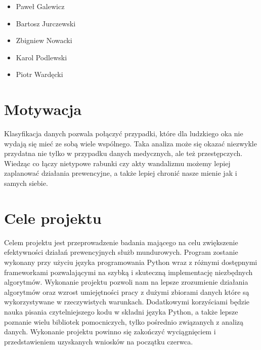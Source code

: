 \documentclass[a4paper,11pt]{article}
\begin{document}
\begin{itemize}[noitemsep,topsep=0pt,leftmargin=1.1cm]
    \item Paweł Galewicz        
    \item Bartosz Jurczewski    
    \item Zbigniew Nowacki      
    \item Karol Podlewski       
    \item Piotr Wardęcki        
\end{itemize}



\section{Motywacja} \label{sec:motywacja}

Klasyfikacja danych pozwala połączyć przypadki, które dla ludzkiego oka nie wydają się mieć ze sobą wiele wspólnego. Taka analiza może się okazać niezwykle przydatna nie tylko w przypadku danych medycznych, ale też przestępczych. Wiedząc co łączy nietypowe rabunki czy akty wandalizmu możemy lepiej zaplanować działania prewencyjne, a także lepiej chronić nasze mienie jak i samych siebie.



\section{Cele projektu}

Celem projektu jest przeprowadzenie badania mającego na celu zwiększenie efektywności działań prewencyjnych służb mundurowych. Program zostanie wykonany przy użyciu języka programowania Python wraz z różnymi dostępnymi frameworkami pozwalającymi na szybką i skuteczną implementację niezbędnych algorytmów. Wykonanie projektu pozwoli nam na lepsze zrozumienie działania algorytmów oraz wzrost umiejętności pracy z dużymi zbiorami danych które są wykorzystywane w rzeczywistych warunkach. Dodatkowymi korzyściami będzie nauka pisania czytelniejszego kodu w składni języka Python, a także lepsze poznanie wielu bibliotek pomocniczych, tylko pośrednio związanych z analizą danych. Wykonanie projektu powinno się zakończyć wyciągnięciem i przedstawieniem uzyskanych wniosków na początku czerwca.

\end{document}
